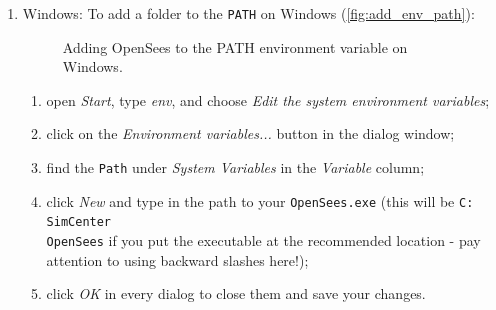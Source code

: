 \begin{enumerate}
\item Windows: To add a folder to the \texttt{PATH} on Windows (\autoref{fig:add_env_path}):

\begin{figure}[!htbp]
  \caption{Adding OpenSees to the PATH environment variable on Windows.}
  \label{fig:add_env_path}
\end{figure}

\begin{enumerate}
    \item open \emph{Start}, type \emph{env}, and choose \emph{Edit the system environment variables};
    \item click on the \emph{Environment variables...} button in the dialog window;
    \item find the \texttt{Path} under \emph{System Variables} in the \emph{Variable} column;
    \item click \emph{New} and type in the path to your \texttt{OpenSees.exe} (this will be \texttt{C:\\SimCenter\\OpenSees} if you put the executable at the recommended location - pay attention to using backward slashes here!);
    \item click \emph{OK} in every dialog to close them and save your changes.
\end{enumerate}


\end{enumerate}

